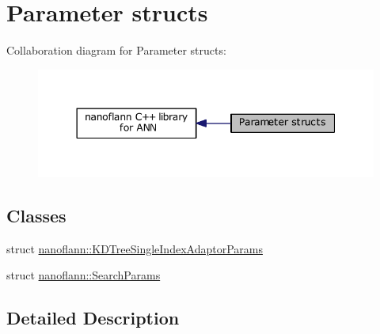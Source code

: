 \hypertarget{group__param__grp}{\section{Parameter structs}
\label{group__param__grp}
}
Collaboration diagram for Parameter structs\-:
\nopagebreak
\begin{figure}[H]
\begin{center}
\leavevmode
\includegraphics[width=344pt]{group__param__grp}
\end{center}
\end{figure}
\subsection*{Classes}
\begin{DoxyCompactItemize}
\item 
struct \hyperlink{structnanoflann_1_1_k_d_tree_single_index_adaptor_params}{nanoflann\-::\-K\-D\-Tree\-Single\-Index\-Adaptor\-Params}
\item 
struct \hyperlink{structnanoflann_1_1_search_params}{nanoflann\-::\-Search\-Params}
\end{DoxyCompactItemize}


\subsection{Detailed Description}
